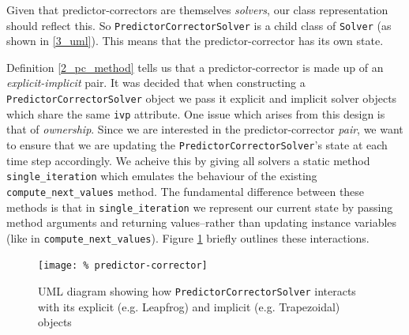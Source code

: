 \documentclass[12pt, twoside]{report}
\theoremstyle{plain}
\theoremstyle{definition}
\theoremstyle{definition}
\begin{document}
            Given that predictor-correctors are themselves \textit{solvers}, 
            our class representation should reflect this. So 
            \texttt{PredictorCorrectorSolver} is a 
            child class of \texttt{Solver} (as shown in 
            \ref{3_uml}). This means that the predictor-corrector has its own 
            state. 

            Definition \ref{2_pc_method} tells us that a predictor-corrector
            is made up of an \textit{explicit-implicit} pair. It was decided 
            that when constructing a 
            \texttt{PredictorCorrectorSolver} object we 
            pass it explicit and implicit solver objects which share the same
            \texttt{ivp} attribute. One issue which arises from 
            this design is that of \textit{ownership}. Since we are interested
            in the predictor-corrector \textit{pair}, we want to ensure that we
            are updating the \texttt{PredictorCorrectorSolver}'s 
            state at each time step accordingly. We acheive this by giving all
            solvers a static method \texttt{single_iteration} which
            emulates the behaviour of the existing 
            \texttt{compute_next_values} method. The fundamental 
            difference between these methods is that in 
            \texttt{single_iteration} we represent our current
            state by passing method arguments and returning values--rather than
            updating instance variables (like in 
            \texttt{compute_next_values}). Figure \ref{3_pc_uml} 
            briefly outlines these interactions.

            \begin{figure}
                \centering
                    \texttt{[image: \%
                    predictor-corrector]}
                    \caption{UML diagram showing how 
                    \texttt{PredictorCorrectorSolver} interacts 
                    with its explicit (e.g. Leapfrog) and implicit 
                    (e.g. Trapezoidal) objects}
                    \label{3_pc_uml}
            \end{figure}
\end{document}
